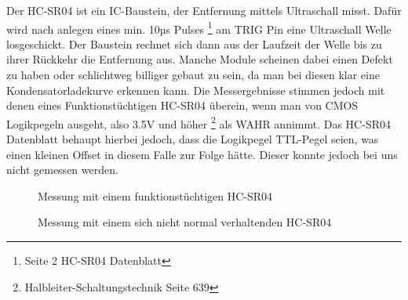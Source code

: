 \documentclass[12pt,a4paper]{article}
\begin{document}
	Der HC-SR04 ist ein IC-Baustein, der Entfernung mittels Ultraschall
	misst. Dafür wird nach anlegen eines min. 10µs Pulses
	\footnote{Seite 2 HC-SR04 Datenblatt}
	am TRIG Pin
	eine Ultraschall Welle losgeschickt. Der Baustein rechnet sich dann aus
	der Laufzeit der Welle bis zu ihrer Rückkehr die Entfernung aus. Manche
	Module scheinen dabei einen Defekt zu haben oder schlichtweg billiger
	gebaut zu sein, da man bei diesen klar eine Kondensatorladekurve
	erkennen kann. Die Messergebnisse stimmen jedoch mit denen eines
	Funktionstüchtigen HC-SR04 überein, wenn man von CMOS Logikpegeln
	ausgeht, also 3.5V und höher 
	\footnote{Halbleiter-Schaltungstechnik Seite 639} als 
	WAHR annimmt. Das HC-SR04 Datenblatt behaupt hierbei jedoch, dass die
	Logikpegel TTL-Pegel seien, was einen kleinen Offset in diesem Falle
	zur Folge hätte. Dieser konnte jedoch bei uns nicht gemessen werden.
	

	\begin{figure}[H]
		
		\centering
		\label{fig:hc-sr04_working}

		\caption{Messung mit einem funktionstüchtigen HC-SR04}
	\end{figure}
	
	\begin{figure}[H]
		
		\centering
		\label{fig:hc-sr04_broken}

		\caption{Messung mit einem sich nicht normal verhaltenden 
			HC-SR04}
	\end{figure}
\end{document}
